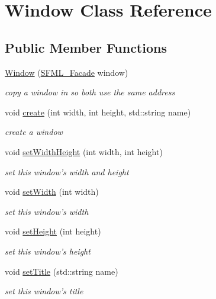 \hypertarget{class_window}{\section{Window Class Reference}
\label{class_window}
}
\subsection*{Public Member Functions}
\begin{DoxyCompactItemize}
\item 
\hyperlink{class_window_a4a680ada9e0fea7c45c8c84614cb5699}{Window} (\hyperlink{class_s_f_m_l___facade}{S\-F\-M\-L\-\_\-\-Facade} window)
\begin{DoxyCompactList}\small\item\em copy a window in so both use the same address \end{DoxyCompactList}\item 
void \hyperlink{class_window_ac10f45b63d94348594f65398c0583151}{create} (int width, int height, std\-::string name)
\begin{DoxyCompactList}\small\item\em create a window \end{DoxyCompactList}\item 
void \hyperlink{class_window_a574ee2df1903f21e80b2e1c3ad487339}{set\-Width\-Height} (int width, int height)
\begin{DoxyCompactList}\small\item\em set this window's width and height \end{DoxyCompactList}\item 
void \hyperlink{class_window_a1f38c584ac5fb56dd4de62f56d8e62e3}{set\-Width} (int width)
\begin{DoxyCompactList}\small\item\em set this window's width \end{DoxyCompactList}\item 
void \hyperlink{class_window_af84228b0e73053ce7632bef29047b57b}{set\-Height} (int height)
\begin{DoxyCompactList}\small\item\em set this window's height \end{DoxyCompactList}\item 
void \hyperlink{class_window_ab10e764f00af15dab354b9693db252fe}{set\-Title} (std\-::string name)
\begin{DoxyCompactList}\small\item\em set this window's title \end{DoxyCompactList}\item 

\end{DoxyCompactItemize}
